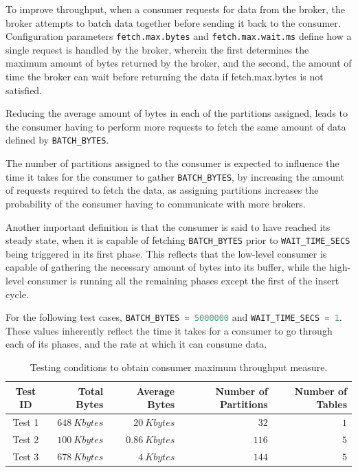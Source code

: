 To improve throughput, when a consumer requests for data from the broker, the
broker attempts to batch data together before sending it back to the consumer.
Configuration parameters \lstinline{fetch.max.bytes} and
\lstinline{fetch.max.wait.ms} define how a single request is handled by the
broker, wherein the first determines the maximum amount of bytes returned by the
broker, and the second, the amount of time the broker can wait before returning
the data if fetch.max.bytes is not satisfied.

Reducing the average amount of bytes in each of the partitions assigned, leads
to the consumer having to perform more requests to fetch the same amount of data
defined by \lstinline[language=Python]{BATCH_BYTES}. 

The number of partitions assigned to the consumer is expected to influence the
time it takes for the consumer to gather
\lstinline[language=Python]{BATCH_BYTES}, by increasing the amount of requests
required to fetch the data, as assigning partitions increases the probability of
the consumer having to communicate with more brokers. 

Another important definition is that the consumer is said to have reached its
steady state, when it is capable of fetching
\lstinline[language=Python]{BATCH_BYTES} prior to
\lstinline[language=Python]{WAIT_TIME_SECS} being triggered in its first phase.
This reflects that the low-level consumer is capable of gathering the necessary
amount of bytes into its buffer, while the high-level consumer is running all
the remaining phases except the first of the insert cycle.

For the following test cases, \lstinline[language=Python]{BATCH_BYTES = 5000000}
and \lstinline[language=Python]{WAIT_TIME_SECS = 1}.  These values inherently
reflect the time it takes for a consumer to go through each of its phases, and
the rate at which it can consume data.

\begin{table}[H] 
\centering 
\caption{
    Testing conditions to obtain consumer maximum throughput measure.
} 
    \begin{tabular}{ |c|r|r|r|r| } 
        \hline
        \textbf{Test ID} & \textbf{Total Bytes} & \textbf{Average Bytes} &
            \textbf{Number of Partitions} & \textbf{Number of Tables} \\ 
        \hline 
        Test 1 & $648\ Kbytes$ & $20\ Kbytes$ & $32$ & $1$ \\ 
        Test 2 & $100\ Kbytes$ & $0.86\ Kbytes$ & $116$ & $5$ \\ 
        Test 3 & $678\ Kbytes$ & $4\ Kbytes$ & $144$ & $5$ \\ 
        \hline
    \end{tabular} 
\end{table}

